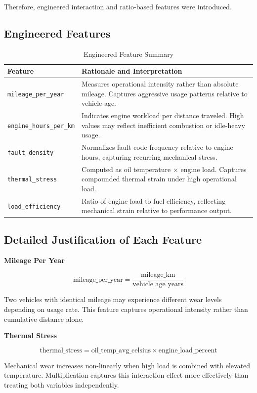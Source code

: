 \documentclass[12pt, a4paper]{article}
\begin{document}
Therefore, engineered interaction and ratio-based features were introduced.

\subsection{Engineered Features}

\begin{table}[H]
\centering
\caption{Engineered Feature Summary}
\begin{tabularx}{\textwidth}{lX}
\toprule
\textbf{Feature} & \textbf{Rationale and Interpretation} \\
\midrule
\texttt{mileage\_per\_year} & Measures operational intensity rather than absolute mileage. Captures aggressive usage patterns relative to vehicle age. \\
\texttt{engine\_hours\_per\_km} & Indicates engine workload per distance traveled. High values may reflect inefficient combustion or idle-heavy usage. \\
\texttt{fault\_density} & Normalizes fault code frequency relative to engine hours, capturing recurring mechanical stress. \\
\texttt{thermal\_stress} & Computed as oil temperature $\times$ engine load. Captures compounded thermal strain under high operational load. \\
\texttt{load\_efficiency} & Ratio of engine load to fuel efficiency, reflecting mechanical strain relative to performance output. \\
\bottomrule
\end{tabularx}
\end{table}

\subsection{Detailed Justification of Each Feature}

\textbf{Mileage Per Year}

\[
\text{mileage\_per\_year} = \frac{\text{mileage\_km}}{\text{vehicle\_age\_years}}
\]

Two vehicles with identical mileage may experience different wear levels depending on usage rate. This feature captures operational intensity rather than cumulative distance alone.

\textbf{Thermal Stress}

\[
\text{thermal\_stress} = \text{oil\_temp\_avg\_celsius} \times \text{engine\_load\_percent}
\]

Mechanical wear increases non-linearly when high load is combined with elevated temperature. Multiplication captures this interaction effect more effectively than treating both variables independently.
\end{document}
